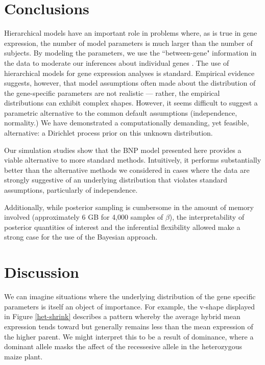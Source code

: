 \section{Conclusions}
Hierarchical models have an important role in problems where, as is true in gene expression, the number of model parameters is much larger than the number of subjects. By modeling the parameters, we use the ``between-gene" information in the data to moderate our inferences about individual genes . The use of hierarchical models for gene expression analyses is standard. Empirical evidence suggests, however, that model assumptions often made about the distribution of the gene-specific parameters are not realistic --- rather, the empirical distributions can exhibit complex shapes. However, it seems difficult to suggest a parametric alternative to the common default assumptions (independence, normality.) We have demonstrated a computationally demanding, yet feasible, alternative: a Dirichlet process prior on this unknown distribution.

Our simulation studies show that the BNP model presented here provides a viable alternative to more standard methods. Intuitively, it performs substantially better than the alternative methods we considered in cases where the data are strongly suggestive of an underlying distribution that violates standard assumptions, particularly of independence.

Additionally, while posterior sampling is cumbersome in the amount of memory involved (approximately 6 GB for 4,000 samples of $\beta$), the interpretability of posterior quantities of interest and the inferential flexibility allowed make a strong case for the use of the Bayesian approach.

\section{Discussion}

We can imagine situations where the underlying distribution of the gene specific parameters is itself an object of importance. For example, the v-shape displayed in Figure \ref{het-shrink} describes a pattern whereby the average hybrid mean expression tends toward but generally remains less than the mean expression of the higher parent. We might interpret this to be a result of dominance, where a dominant allele masks the affect of the recessesive allele in the heterozygous maize plant.

